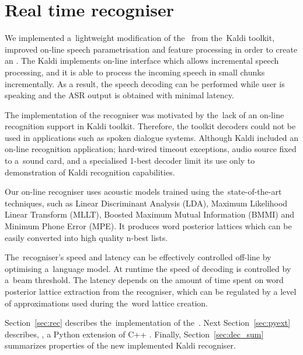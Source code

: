 \chapter{Real time recogniser}
\label{cha:decoder}

We implemented a~lightweight modification of the~ from the~Kaldi toolkit, improved on-line speech parametrisation and feature processing in order to create an .
The Kaldi  implements on-line interface which allows incremental speech processing, and it is able to process the incoming speech in small chunks incrementally.
As a result, the speech decoding can be performed while user is speaking and the ASR output is obtained with minimal latency.

The implementation of the recogniser was motivated by the~lack of an on-line recognition support in Kaldi toolkit.
Therefore, the toolkit decoders could not be used in applications such as spoken dialogue systems.
Although Kaldi included an on-line recognition application; hard-wired timeout exceptions, audio source fixed to a~sound card, and a specialised 1-best decoder limit its use only to demonstration of Kaldi recognition capabilities.

Our on-line recogniser uses acoustic models trained using the~state-of-the-art techniques, 
such as Linear Discriminant Analysis (LDA), Maximum Likelihood Linear Transform (MLLT), Boosted Maximum Mutual Information (BMMI) and Minimum Phone Error (MPE).
It produces word posterior lattices which can be easily converted into high quality n-best lists.

The~recogniser's speed and latency can be effectively controlled off-line by optimising a~language model. 
At runtime the speed of decoding is controlled by a~beam threshold.
The latency depends on the amount of time spent on word posterior lattice extraction from the recogniser, which can be regulated by a level of approximations used during the~word lattice creation.

Section~\ref{sec:rec} describes the~implementation of the~.
Next Section~\ref{sec:pyext} describes, , a Python extension of C++ .
Finally, Section~\ref{sec:dec_sum} summarizes properties of the new implemented Kaldi recogniser.

